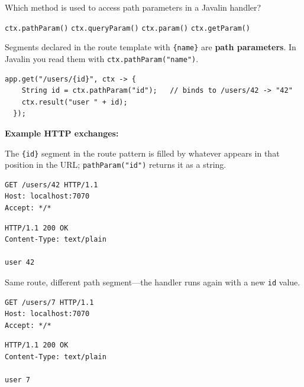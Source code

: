 \question[4]
Which method is used to access path parameters in a Javalin handler?
\begin{choices}
  \CorrectChoice \texttt{ctx.pathParam()}
  \choice \texttt{ctx.queryParam()}
  \choice \texttt{ctx.param()}
  \choice \texttt{ctx.getParam()}
\end{choices}
\begin{solution}
  Segments declared in the route template with \texttt{\{name\}} are \textbf{path parameters}. In Javalin you read them with \texttt{ctx.pathParam("name")}.

  \begin{lstlisting}[style=javaexam] 
  app.get("/users/{id}", ctx -> {
    String id = ctx.pathParam("id");   // binds to /users/42 -> "42"
    ctx.result("user " + id);
  });
  \end{lstlisting}

  \noindent\textbf{Example HTTP exchanges:}\par
  \noindent The \texttt{\{id\}} segment in the route pattern is filled by whatever appears in that position in the URL; \texttt{pathParam("id")} returns it as a string.\par
  \begin{httpexchange}
\begin{lstlisting}[style=http]
GET /users/42 HTTP/1.1
Host: localhost:7070
Accept: */*

\end{lstlisting}
\httpmidarrows
\begin{lstlisting}[style=http]
HTTP/1.1 200 OK
Content-Type: text/plain

user 42
\end{lstlisting}
  \end{httpexchange}

  \noindent Same route, different path segment---the handler runs again with a new \texttt{id} value.\par
  \begin{httpexchange}
\begin{lstlisting}[style=http]
GET /users/7 HTTP/1.1
Host: localhost:7070
Accept: */*

\end{lstlisting}
\httpmidarrows
\begin{lstlisting}[style=http]
HTTP/1.1 200 OK
Content-Type: text/plain

user 7
\end{lstlisting}
  \end{httpexchange}


\end{solution}

